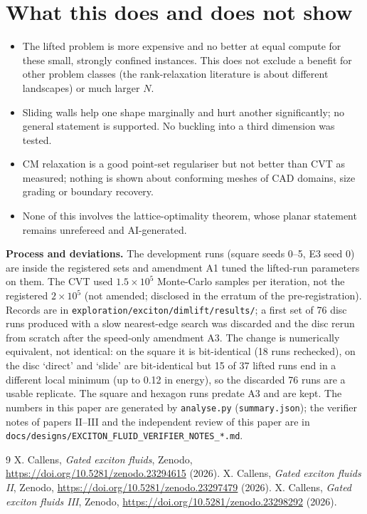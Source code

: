 \documentclass[11pt,a4paper]{article}
\begin{document}
\section{What this does and does not show}

\begin{itemize}[leftmargin=1.2em,itemsep=1pt]
\item The lifted problem is more expensive and no better at equal compute for these small, strongly confined instances. This does
not exclude a benefit for other problem classes (the rank-relaxation literature is about different landscapes) or much larger $N$.
\item Sliding walls help one shape marginally and hurt another significantly; no general statement is supported. No buckling into a
third dimension was tested.
\item CM relaxation is a good point-set regulariser but not better than CVT as measured; nothing is shown about conforming
meshes of CAD domains, size grading or boundary recovery.
\item None of this involves the lattice-optimality theorem, whose planar statement remains unrefereed and AI-generated.
\end{itemize}

\textbf{Process and deviations.} The development runs (square seeds 0--5, E3 seed 0) are inside the registered sets and
amendment A1 tuned the lifted-run parameters on them. The CVT used $1.5\times10^5$ Monte-Carlo samples per iteration, not the registered
$2\times10^5$ (not amended; disclosed in the erratum of the pre-registration). Records are in \texttt{exploration/exciton/dimlift/results/}; a first set of 76 disc runs produced with a slow
nearest-edge search was discarded and the disc rerun from scratch after the speed-only amendment A3. The change is numerically equivalent, not identical: on the square it is bit-identical
(18 runs rechecked), on the disc `direct' and `slide' are bit-identical but 15 of 37 lifted runs end in a different local minimum (up to
0.12 in energy), so the discarded 76 runs are a usable replicate. The square and hexagon runs predate A3 and are kept. The numbers in this paper are generated by \texttt{analyse.py} (\texttt{summary.json}); the
verifier notes of papers II--III and the independent review of this paper are in \texttt{docs/designs/EXCITON\_FLUID\_VERIFIER\_NOTES\_*.md}.

\begin{thebibliography}{9}\small
{} X. Callens, \emph{Gated exciton fluids}, Zenodo, \url{https://doi.org/10.5281/zenodo.23294615} (2026).
 X. Callens, \emph{Gated exciton fluids II}, Zenodo, \url{https://doi.org/10.5281/zenodo.23297479} (2026).
 X. Callens, \emph{Gated exciton fluids III}, Zenodo, \url{https://doi.org/10.5281/zenodo.23298292} (2026).
\end{thebibliography}
\end{document}
